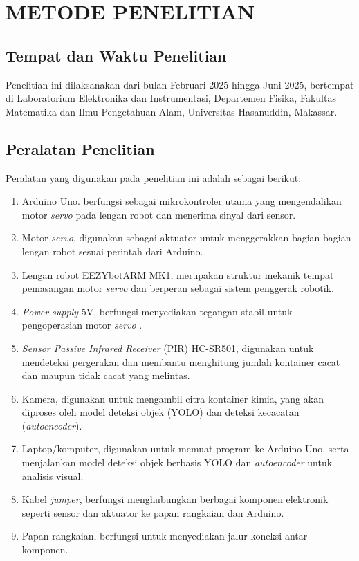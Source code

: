 \chapter{METODE PENELITIAN}
\section{Tempat dan Waktu Penelitian}
Penelitian ini dilaksanakan dari bulan Februari 2025 hingga Juni
2025, bertempat di Laboratorium Elektronika dan Instrumentasi,
Departemen Fisika, Fakultas Matematika dan Ilmu Pengetahuan Alam,
Universitas Hasanuddin, Makassar.

\vspace{1em}

\section{Peralatan Penelitian}
Peralatan yang digunakan pada penelitian ini adalah sebagai berikut:
\begin{enumerate}
  \item Arduino Uno. berfungsi sebagai mikrokontroler utama yang
    mengendalikan motor \textit{servo} pada lengan robot dan menerima
    sinyal dari sensor.
  \item Motor \textit{servo}, digunakan sebagai aktuator untuk
    menggerakkan bagian-bagian lengan robot sesuai perintah dari Arduino.
  \item Lengan robot EEZYbotARM MK1, merupakan struktur
    mekanik  tempat pemasangan motor \textit{servo} dan berperan
    sebagai sistem penggerak robotik.
  \item \textit{Power supply} 5V, berfungsi menyediakan tegangan
    stabil untuk pengoperasian motor \textit{servo} .
  \item \textit{Sensor Passive Infrared Receiver} (PIR) HC-SR501,
    digunakan untuk mendeteksi pergerakan dan membantu
    menghitung jumlah kontainer cacat dan maupun tidak cacat yang melintas.
  \item Kamera, digunakan untuk mengambil citra kontainer kimia, yang
    akan diproses oleh model deteksi objek (YOLO) dan deteksi kecacatan
    (\textit{autoencoder}).
  \item Laptop/komputer, digunakan untuk memuat program ke Arduino
    Uno, serta menjalankan model deteksi objek berbasis YOLO dan
    \textit{autoencoder} untuk analisis visual.
  \item Kabel \textit{jumper}, berfungsi menghubungkan berbagai komponen
    elektronik seperti sensor dan aktuator ke papan rangkaian dan
    Arduino.
  \item Papan rangkaian, berfungsi untuk menyediakan jalur koneksi
    antar komponen.
\end{enumerate}

